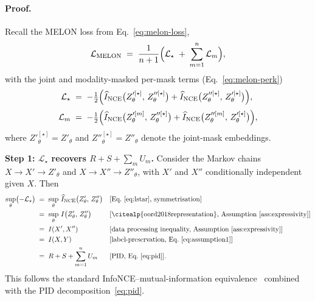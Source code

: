 \documentclass{article}
\theoremstyle{plain}
\theoremstyle{definition}
\begin{document}
\paragraph{Proof.}
Recall the MELON loss from Eq.~\ref{eq:melon-loss},
\begin{equation}\label{eq:melon-loss-restate}
  \mathcal{L}_{\mathrm{MELON}}
  \;=\; \frac{1}{n+1}\Bigl(\mathcal{L}_{\star} \;+\; \sum_{m=1}^{n} \mathcal{L}_{m}\Bigr),
\end{equation}
with the joint and modality-masked per-mask terms (Eq.~\ref{eq:melon-perk})
\begin{align}
  \mathcal{L}_{\star}
    &\;=\; -\tfrac{1}{2}\Bigl(\widehat{I}_{\mathrm{NCE}}\bigl(Z'^{[\star]}_\theta,\, Z''^{[\star]}_\theta\bigr) + \widehat{I}_{\mathrm{NCE}}\bigl(Z''^{[\star]}_\theta,\, Z'^{[\star]}_\theta\bigr)\Bigr),
    \label{eq:lstar}\\[2pt]
  \mathcal{L}_{m}
    &\;=\; -\tfrac{1}{2}\Bigl(\widehat{I}_{\mathrm{NCE}}\bigl(Z'^{[m]}_\theta,\, Z''^{[\star]}_\theta\bigr) + \widehat{I}_{\mathrm{NCE}}\bigl(Z''^{[m]}_\theta,\, Z'^{[\star]}_\theta\bigr)\Bigr),
    \label{eq:lm}
\end{align}
where $Z'^{[\star]}_\theta = Z'_\theta$ and $Z''^{[\star]}_\theta = Z''_\theta$ denote the joint-mask embeddings.

\textbf{Step 1: $\mathcal{L}_{\star}$ recovers $R + S + \sum_m U_m$.}
Consider the Markov chains $X \to X' \to Z'_\theta$ and $X \to X'' \to Z''_\theta$, with $X'$ and $X''$ conditionally independent given $X$. Then
\begin{equation}\label{eq:step1-chain}
\begin{aligned}
\sup_{\theta} \bigl(-\mathcal{L}_{\star}\bigr)
  \;&=\; \sup_{\theta}\, \widehat{I}_{\mathrm{NCE}}\bigl(Z'_\theta,\, Z''_\theta\bigr)
    && \text{[Eq.~\eqref{eq:lstar}, symmetrisation]} \\
  \;&=\; \sup_{\theta}\, I\bigl(Z'_\theta,\, Z''_\theta\bigr)
    && \text{[\citealp{oord2018representation}, Assumption~\ref{ass:expressivity}]} \\
  \;&=\; I(X', X'')
    && \text{[data processing inequality, Assumption~\ref{ass:expressivity}]} \\
  \;&=\; I(X, Y)
    && \text{[label-preservation, Eq.~\eqref{eq:assumption1}]} \\
  \;&=\; R + S + \sum_{m=1}^{n} U_m
    && \text{[PID, Eq.~\eqref{eq:pid}]}.
\end{aligned}
\end{equation}
This follows the standard InfoNCE--mutual-information equivalence~\citep{oord2018representation} combined with the PID decomposition~\eqref{eq:pid}.
\end{document}
